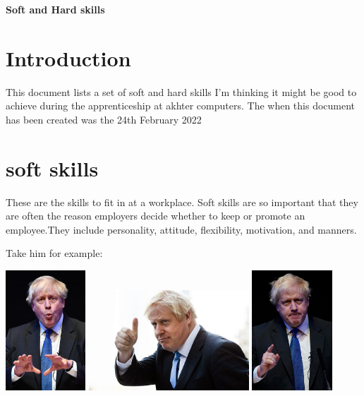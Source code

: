 \documentclass[a4paper,12pt]{article}
\begin{document}
\textbf{Soft and Hard skills}


\tableofcontents
\clearpage

 
\section{Introduction}
This document lists a set of soft and hard skills I'm thinking it might be good to achieve during the apprenticeship at akhter computers. The when this document has been created was the 24th February 2022

\section{soft skills}
These are the skills to fit in at a workplace. Soft skills are so important that they are often the reason employers decide whether to keep or promote an employee.They include personality, attitude, flexibility, motivation, and manners.

Take him for example:

\includegraphics[width=3cm]{./boris-soft.jpg}
\includegraphics[width=6cm]{./boris-soft3.jpg}
\includegraphics[width=3cm]{./boris-soft2.jpg}
\end{document}
